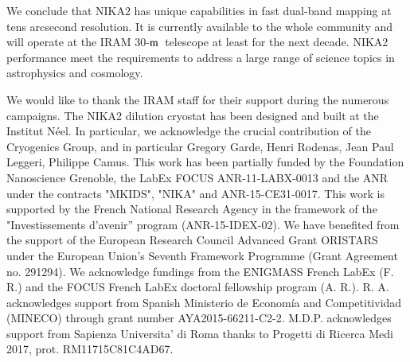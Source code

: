 \documentclass[traditionalabstract]{aa}
\newcommand{\trentemetre}{30-$\rm{m}$}
\newcommand{\lp}[1]{#1}
\begin{document}
We conclude that NIKA2 has unique capabilities in fast dual-band
mapping at tens arcsecond resolution. {\lp It is currently available to the
whole community and will operate at the IRAM \trentemetre\ telescope
at least for the next decade.}
NIKA2 performance meet the requirements
to address a large range of science topics in astrophysics and
cosmology. 




%


\begin{acknowledgements}
  We would like to thank the IRAM staff for their support during the
  numerous campaigns. 
  The NIKA2 dilution cryostat has been designed and built at the Institut N\'eel. 
  In particular, we acknowledge the crucial contribution of the Cryogenics Group, and 
  in particular Gregory Garde, Henri Rodenas, Jean Paul Leggeri, Philippe Camus. 
  This work has been partially funded by the Foundation Nanoscience
  Grenoble, the LabEx FOCUS ANR-11-LABX-0013 and the ANR under the
  contracts "MKIDS", "NIKA" and ANR-15-CE31-0017. This work is
  supported by the French National Research Agency in the framework of
  the "Investissements d’avenir” program (ANR-15-IDEX-02).
  We have benefited from the support of the European Research Council Advanced
  Grant ORISTARS under the European Union's Seventh Framework
  Programme (Grant Agreement no. 291294). We acknowledge fundings from
  the ENIGMASS French LabEx (F. R.) and the FOCUS French LabEx
  doctoral fellowship program (A. R.). R. A. acknowledges support from
  Spanish Ministerio de Econom\'ia and Competitividad (MINECO) through
  grant number AYA2015-66211-C2-2. M.D.P. acknowledges support from
  Sapienza Universita' di Roma thanks to Progetti di Ricerca Medi 2017,
  prot. RM11715C81C4AD67. 
\end{acknowledgements}
\end{document}
